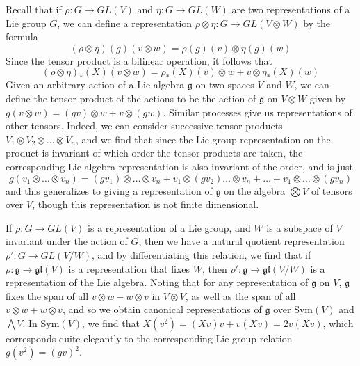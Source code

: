 \begin{example}
    Recall that if $\rho: G \to GL(V)$ and $\eta: G \to GL(W)$ are two representations of a Lie group $G$, we can define a representation $\rho \otimes \eta: G \to GL(V \otimes W)$ by the formula
    \[ (\rho \otimes \eta)(g)(v \otimes w) = \rho(g)(v) \otimes \eta(g)(w) \]
    Since the tensor product is a bilinear operation, it follows that
    \[ (\rho \otimes \eta)_*(X)(v \otimes w) = \rho_*(X)(v) \otimes w + v \otimes \eta_*(X)(w) \]
    Given an arbitrary action of a Lie algebra $\mathfrak{g}$ on two spaces $V$ and $W$, we can define the tensor product of the actions to be the action of $\mathfrak{g}$ on $V \otimes W$ given by $g(v \otimes w) = (gv) \otimes w + v \otimes (gw)$. Similar processes give us representations of other tensors. Indeed, we can consider successive tensor products $V_1 \otimes V_2 \otimes \dots \otimes V_n$, and we find that since the Lie group representation on the product is invariant of which order the tensor products are taken, the corresponding Lie algebra representation is also invariant of the order, and is just
    \[ g(v_1 \otimes \dots \otimes v_n) = (gv_1) \otimes \dots \otimes v_n + v_1 \otimes (gv_2) \dots \otimes v_n + \dots + v_1 \otimes \dots \otimes (gv_n) \]
    and this generalizes to giving a representation of $\mathfrak{g}$ on the algebra $\bigotimes V$ of tensors over $V$, though this representation is not finite dimensional.
\end{example}

\begin{example}
    If $\rho: G \to GL(V)$ is a representation of a Lie group, and $W$ is a subspace of $V$ invariant under the action of $G$, then we have a natural quotient representation $\rho': G \to GL(V/W)$, and by differentiating this relation, we find that if $\rho: \mathfrak{g} \to \mathfrak{gl}(V)$ is a representation that fixes $W$, then $\rho': \mathfrak{g} \to \mathfrak{gl}(V/W)$ is a representation of the Lie algebra. Noting that for any representation of $\mathfrak{g}$ on $V$, $\mathfrak{g}$ fixes the span of all $v \otimes w - w \otimes v$ in $V \otimes V$, as well as the span of all $v \otimes w + w \otimes v$, and so we obtain canonical representations of $\mathfrak{g}$ over $\text{Sym}(V)$ and $\bigwedge V$. In $\text{Sym}(V)$, we find that $X(v^2) = (Xv)v + v(Xv) = 2v(Xv)$, which corresponds quite elegantly to the corresponding Lie group relation $g(v^2) = (gv)^2$.
\end{example}

